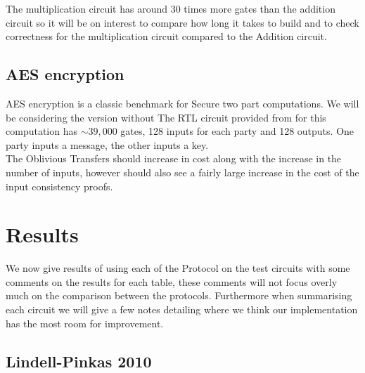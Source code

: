 \documentclass[ %
                    author={Nicholas Tutte},
                supervisor={Prof. Nigel Smart},
                    degree={MEng},
                     title={Secure Two Party Computation},
                  subtitle={A practical comparison of recent protocols},
                      type={Research - GG1K},
                      year={2015} ]{dissertation}
\begin{document}
				The multiplication circuit has around $30$ times more gates than the addition circuit so it will be on interest to compare how long it takes to build and to check correctness for the multiplication circuit compared to the Addition circuit.

			\subsection{AES encryption}

				AES encryption is a classic benchmark for Secure two part computations. We will be considering the version without The RTL circuit provided from \cite{NigelCircuits} for this computation has $\sim 39,000$ gates, 128 inputs for each party and 128 outputs. One party inputs a message, the other inputs a key.\\

				The Oblivious Transfers should increase in cost along with the increase in the number of inputs, however should also see a fairly large increase in the cost of the input consistency proofs.

		\section{Results}
			We now give results of using each of the Protocol on the test circuits with some comments on the results for each table, these comments will not focus overly much on the comparison between the protocols. Furthermore when summarising each circuit we will give a few notes detailing where we think our implementation has the most room for improvement.

			\FloatBarrier
			\subsection{Lindell-Pinkas 2010}
\end{document}
